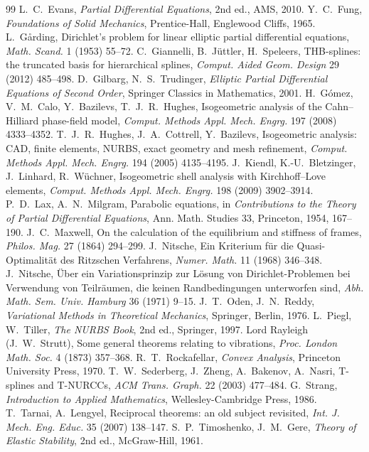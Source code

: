 \begin{chapterbib}{99}
 L.~C.~Evans, \emph{Partial Differential Equations}, 2nd ed., AMS, 2010.
 Y.~C.~Fung, \emph{Foundations of Solid Mechanics}, Prentice-Hall, Englewood Cliffs, 1965.
 L.~G\aa rding, Dirichlet's problem for linear elliptic partial differential equations, \emph{Math. Scand.} 1 (1953) 55--72.
 C.~Giannelli, B.~J\"uttler, H.~Speleers, THB-splines: the truncated basis for hierarchical splines, \emph{Comput. Aided Geom. Design} 29 (2012) 485--498.
 D.~Gilbarg, N.~S.~Trudinger, \emph{Elliptic Partial Differential Equations of Second Order}, Springer Classics in Mathematics, 2001.
 H.~G\'omez, V.~M.~Calo, Y.~Bazilevs, T.~J.~R.~Hughes, Isogeometric analysis of the Cahn--Hilliard phase-field model, \emph{Comput. Methods Appl. Mech. Engrg.} 197 (2008) 4333--4352.
 T.~J.~R.~Hughes, J.~A.~Cottrell, Y.~Bazilevs, Isogeometric analysis: CAD, finite elements, NURBS, exact geometry and mesh refinement, \emph{Comput. Methods Appl. Mech. Engrg.} 194 (2005) 4135--4195.
 J.~Kiendl, K.-U.~Bletzinger, J.~Linhard, R.~W\"uchner, Isogeometric shell analysis with Kirchhoff--Love elements, \emph{Comput. Methods Appl. Mech. Engrg.} 198 (2009) 3902--3914.
 P.~D.~Lax, A.~N.~Milgram, Parabolic equations, in \emph{Contributions to the Theory of Partial Differential Equations}, Ann. Math. Studies 33, Princeton, 1954, 167--190.
 J.~C.~Maxwell, On the calculation of the equilibrium and stiffness of frames, \emph{Philos. Mag.} 27 (1864) 294--299.
 J.~Nitsche, Ein Kriterium f\"ur die Quasi-Optimalit\"at des Ritzschen Verfahrens, \emph{Numer. Math.} 11 (1968) 346--348.
 J.~Nitsche, \"Uber ein Variationsprinzip zur L\"osung von Dirichlet-Problemen bei Verwendung von Teilr\"aumen, die keinen Randbedingungen unterworfen sind, \emph{Abh. Math. Sem. Univ. Hamburg} 36 (1971) 9--15.
 J.~T.~Oden, J.~N.~Reddy, \emph{Variational Methods in Theoretical Mechanics}, Springer, Berlin, 1976.
 L.~Piegl, W.~Tiller, \emph{The NURBS Book}, 2nd ed., Springer, 1997.
 Lord Rayleigh (J.~W.~Strutt), Some general theorems relating to vibrations, \emph{Proc. London Math. Soc.} 4 (1873) 357--368.
 R.~T.~Rockafellar, \emph{Convex Analysis}, Princeton University Press, 1970.
 T.~W.~Sederberg, J.~Zheng, A.~Bakenov, A.~Nasri, T-splines and T-NURCCs, \emph{ACM Trans. Graph.} 22 (2003) 477--484.
 G.~Strang, \emph{Introduction to Applied Mathematics}, Wellesley-Cambridge Press, 1986.
 T.~Tarnai, A.~Lengyel, Reciprocal theorems: an old subject revisited, \emph{Int. J. Mech. Eng. Educ.} 35 (2007) 138--147.
 S.~P.~Timoshenko, J.~M.~Gere, \emph{Theory of Elastic Stability}, 2nd ed., McGraw-Hill, 1961.
\end{chapterbib}
